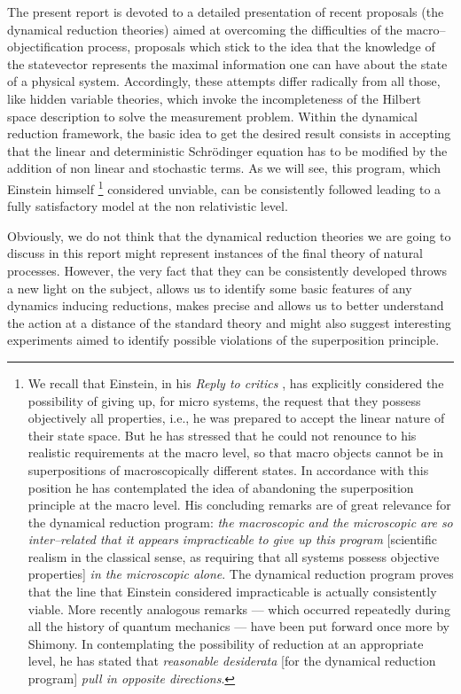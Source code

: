 \documentclass[12pt]{article}
\begin{document}
The present report is devoted to a detailed presentation of recent
proposals (the dynamical reduction theories) aimed at overcoming
the difficulties of the macro--objectification process, proposals
which stick to the idea that the knowledge of the statevector
represents the maximal information one can have about the state of
a physical system. Accordingly, these attempts differ radically
from all those, like hidden variable theories, which invoke the
incompleteness of the Hilbert space description to solve the
measurement problem. Within the dynamical reduction framework, the
basic idea to get the desired result consists in accepting that
the linear and deterministic Schr\"odinger equation has to be
modified by the addition of non linear and stochastic terms. As we
will see, this program, which Einstein himself \footnote{We recall that
Einstein, in his {\it Reply to critics} \cite{eini}, has explicitly
considered the possibility of giving up, for micro systems, the request
that they possess objectively all properties, i.e., he was prepared to
accept the linear nature of their state space. But he has stressed that he
could not renounce to his realistic requirements at the macro
level, so that macro objects cannot be in superpositions of
macroscopically different states. In accordance with this position
he has contemplated the idea of abandoning the superposition
principle at the macro level. His concluding remarks are of great
relevance for the dynamical reduction program: {\it the
macroscopic and the microscopic are so inter--related that it
appears impracticable to give up this program} [scientific realism
in the classical sense, as requiring that all systems possess
objective properties] {\it in the microscopic alone}. The
dynamical reduction program proves that the line that Einstein
considered impracticable is actually consistently viable. More
recently analogous remarks --- which occurred repeatedly during
all the history of quantum mechanics --- have been put forward
once more by Shimony. In contemplating the possibility of
reduction at an appropriate level, he has stated that \cite{shimi}
{\it reasonable desiderata} [for the dynamical reduction program]
{\it pull in opposite directions}.}  considered unviable, can be
consistently followed leading to a fully satisfactory model at the non
relativistic level.

Obviously, we do not think that the  dynamical reduction theories
we are going to discuss in this report might represent instances
of the final theory of natural processes. However, the very fact
that they can be consistently developed throws a new light on the
subject, allows us to identify some basic features of any dynamics
inducing reductions, makes precise and allows us to better
understand the action at a distance of the standard theory and
might also suggest  interesting experiments aimed to identify
possible violations of the superposition principle.
\end{document}
